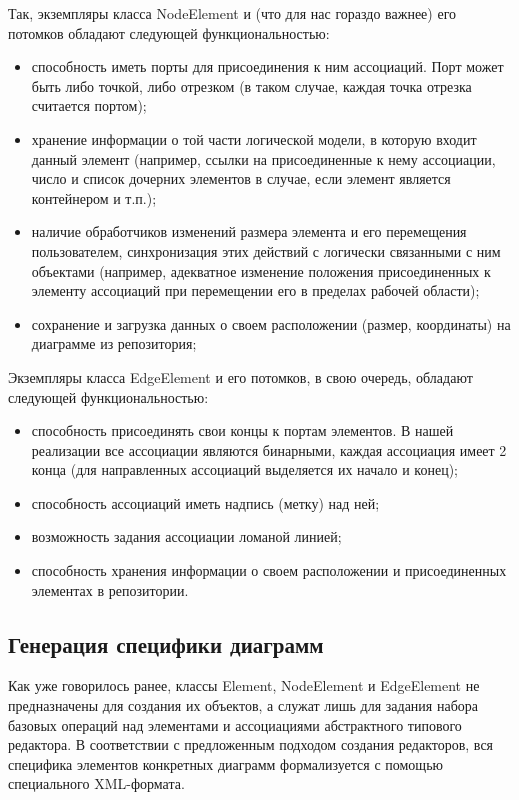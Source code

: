 \documentclass[a5paper]{article}
\begin{document}
Так, экземпляры класса NodeElement и (что для
нас гораздо важнее) его потомков обладают следующей функциональностью:

\begin{itemize}
  \item способность иметь порты для присоединения к ним ассоциаций. Порт может
	быть либо точкой, либо отрезком (в таком случае, каждая точка отрезка
	считается портом);
  \item хранение информации о той части логической модели, в которую входит
	данный элемент (например, ссылки на присоединенные к нему ассоциации,
	число и список дочерних элементов в случае, если элемент является
	контейнером и т.п.);
  \item наличие обработчиков изменений размера элемента и его перемещения
	пользователем, синхронизация этих действий с логически связанными с ним
	объектами (например, адекватное изменение положения присоединенных к
	элементу ассоциаций при перемещении его в пределах рабочей области);
  \item сохранение и загрузка данных о своем расположении (размер, координаты)
	на диаграмме из репозитория;
\end{itemize}

Экземпляры класса EdgeElement и его потомков, в свою очередь, обладают следующей функциональностью:

\begin{itemize}
  \item способность присоединять свои концы к портам элементов. В нашей
	реализации все ассоциации являются бинарными, каждая ассоциация имеет 2
	конца (для направленных ассоциаций выделяется их начало и конец);
  \item способность ассоциаций иметь надпись (метку) над ней;
  \item возможность задания ассоциации ломаной линией;
  \item способность хранения информации о своем расположении и присоединенных
	элементах в репозитории.
\end{itemize}

\subsection{Генерация специфики диаграмм}

Как уже говорилось ранее, классы Element, NodeElement и
EdgeElement не предназначены для создания их объектов, а служат лишь для задания набора базовых операций над
элементами и ассоциациями абстрактного типового редактора. В
соответствии с предложенным подходом создания редакторов, вся специфика
элементов конкретных диаграмм формализуется с помощью специального
XML-формата.
\end{document}
